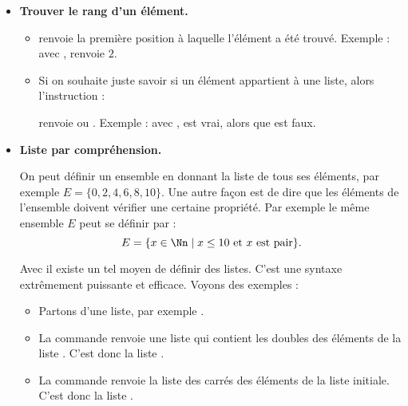 \documentclass[11pt,class=report,crop=false]{standalone}
\begin{document}
\begin{cours}
\begin{itemize}
\begin{itemize}
   \end{itemize} 
   
   

  \item \textbf{Trouver le rang d'un élément.} 

\begin{itemize}

    \item  {}
    renvoie la première position à laquelle l'élément a été trouvé. Exemple : avec ,
    renvoie $2$.

  \item   {} 
  Si on souhaite juste savoir si un élément appartient à une liste, alors l'instruction :\\
  \centerline{}  
  renvoie  ou .
  Exemple : avec ,
   \og{}\fg{} est vrai, alors que \og{}\fg{} est faux.
  
\end{itemize}
   
  \item \textbf{Liste par compréhension.}
  
  
  On peut définir un ensemble en donnant la liste de tous ses éléments, par exemple $E = \{0,2,4,6,8,10\}$. Une autre façon est de dire que les éléments de l'ensemble doivent  vérifier une certaine propriété. Par exemple le même ensemble $E$ peut se définir par :
  $$E = \{ x \in \Nn \mid x \le 10 \text{ et } x \text{ est pair} \}.$$
  
  Avec \Python{} il existe un tel moyen de définir des listes. C'est une syntaxe extrêmement puissante et efficace. Voyons des exemples :
  \begin{itemize}
    \item Partons d'une liste, par exemple .
    
    \item La commande  renvoie une liste qui contient les doubles des éléments de la liste . C'est donc la liste 
    \ci{[2,4,6,8,...]}.
    
    \item La commande  renvoie la liste des carrés des éléments de la liste initiale. C'est donc la liste \ci{[1,4,9,16,...]}.
    

\end{itemize}
\end{itemize}
\end{cours}
\end{document}

